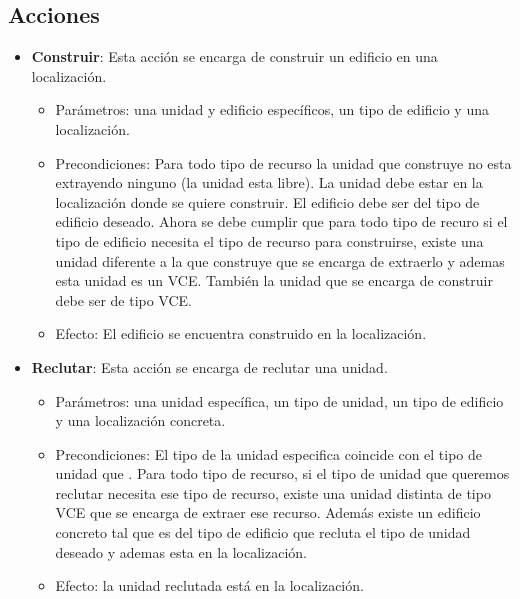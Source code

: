 \subsection{Acciones}
\begin{itemize}
   \item \textbf{Construir}: Esta acción se encarga de construir un edificio en una localización.
   \begin{itemize}
      \item Parámetros: una unidad y edificio específicos, un tipo de edificio y una localización.
      \item Precondiciones: Para todo tipo de recurso la unidad que construye no esta extrayendo ninguno (la unidad esta libre). La unidad debe estar en la localización donde se quiere construir. El edificio debe ser del tipo de edificio deseado. Ahora se debe cumplir que para todo tipo de recuro si el tipo de edificio necesita el tipo de recurso para construirse, existe una unidad diferente a la que construye que se encarga de extraerlo y ademas esta unidad es un VCE. También la unidad que se encarga de construir debe ser de tipo VCE.
      \item Efecto: El edificio se encuentra construido en la localización.
   \end{itemize}
   \item \textbf{Reclutar}: Esta acción se encarga de reclutar una unidad.
   \begin{itemize}
      \item Parámetros: una unidad específica, un tipo de unidad, un tipo de edificio y una localización concreta.
      \item Precondiciones: El tipo de la unidad especifica coincide con el tipo de unidad que . Para todo tipo de recurso, si el tipo de unidad que queremos reclutar necesita ese tipo de recurso, existe una unidad distinta de tipo VCE que se encarga de extraer ese recurso. Además existe un edificio concreto tal que es del tipo de edificio que recluta el tipo de unidad deseado y ademas esta en la localización.
      \item Efecto: la unidad reclutada está en la localización.
   \end{itemize}
\end{itemize}
